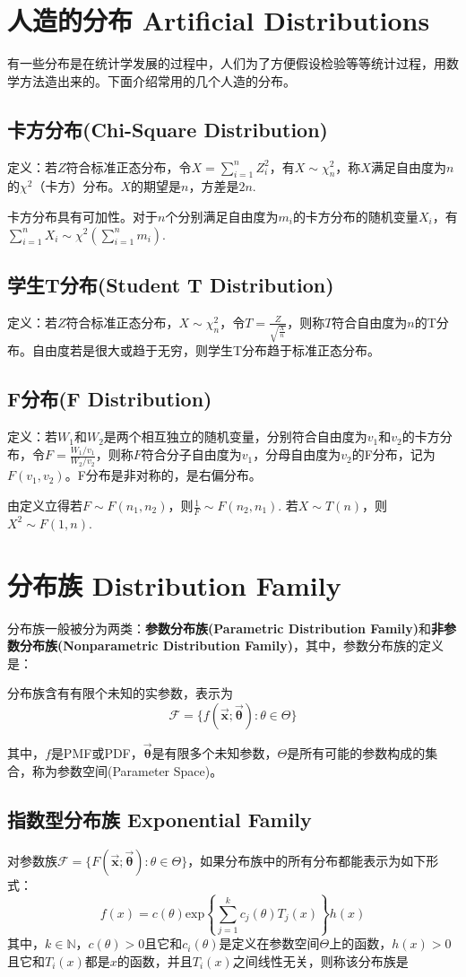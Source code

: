 \documentclass[UTF8]{ctexbook}
\begin{document}
\section{人造的分布 Artificial Distributions}
有一些分布是在统计学发展的过程中，人们为了方便假设检验等等统计过程，用数学方法造出来的。下面介绍常用的几个人造的分布。
\subsection{卡方分布(Chi-Square Distribution)}
\label{chi-square definition}
定义：若$Z$符合标准正态分布，令$X=\sum_{i=1}^nZ_i^2$，有$X\sim \chi^2_n$，称$X$满足自由度为$n$的$\chi^2$（卡方）分布。$X$的期望是$n$，方差是$2n$.

卡方分布具有可加性。对于$n$个分别满足自由度为$m_i$的卡方分布的随机变量$X_i$，有$\sum_{i=1}^nX_i\sim\chi^2(\sum_{i=1}^nm_i)$.
\subsection{学生T分布(Student T Distribution)}
\label{t definition}
定义：若$Z$符合标准正态分布，$X\sim \chi_n^2$，令$T=\frac{Z}{\sqrt{\frac{X}{n}}}$，则称$T$符合自由度为$n$的T分布。自由度若是很大或趋于无穷，则学生T分布趋于标准正态分布。
\subsection{F分布(F Distribution)}
定义：若$W_1$和$W_2$是两个相互独立的随机变量，分别符合自由度为$v_1$和$v_2$的卡方分布，令$F=\frac{W_1/v_1}{W_2/v_2}$，则称$F$符合分子自由度为$v_1$，分母自由度为$v_2$的F分布，记为$F(v_1,v_2)$。F分布是非对称的，是右偏分布。

由定义立得若$F\sim F(n_1,n_2)$，则$\frac{1}{F}\sim F(n_2,n_1)$. 若$X\sim T(n)$，则$X^2\sim F(1,n)$.
\section{分布族 Distribution Family}
分布族一般被分为两类：\textbf{参数分布族(Parametric Distribution Family)}和\textbf{非参数分布族(Nonparametric Distribution Family)}，其中，参数分布族的定义是：

分布族含有有限个未知的实参数，表示为
\[
	\mathcal{F}=\{f(\vec{\boldsymbol x};\vec{\boldsymbol\theta}):\theta\in\Theta\}
\]

其中，$f$是PMF或PDF，$\vec{\boldsymbol\theta}$是有限多个未知参数，$\Theta$是所有可能的参数构成的集合，称为参数空间(Parameter Space)。
\subsection{指数型分布族 Exponential Family}
对参数族$\mathcal{F}=\{F(\vec{\boldsymbol x};\vec{\boldsymbol\theta}):\theta\in\Theta\}$，如果分布族中的所有分布都能表示为如下形式：
\[
	f(x)=c(\theta)\text{exp}\left\{\sum_{j=1}^kc_j(\theta)T_j(x)\right\}h(x)
\]
其中，$k\in\mathbb{N}$，$c(\theta)>0$且它和$c_i(\theta)$是定义在参数空间$\Theta$上的函数，$h(x)>0$且它和$T_i(x)$都是$x$的函数，并且$T_i(x)$之间线性无关，则称该分布族是
\end{document}
